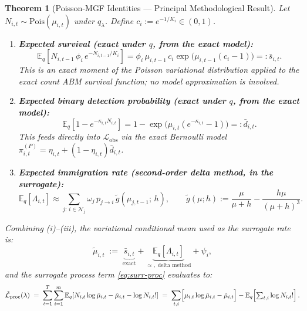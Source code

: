 \documentclass[review,12pt]{elsarticle}
\newtheorem{theorem}{Theorem}
\theoremstyle{definition}
\begin{document}
\begin{theorem}[Poisson-MGF Identities — Principal Methodological Result]\label{thm:elbo}
Let $N_{i,t}\sim\mathrm{Pois}(\mu_{i,t})$ under $q_\lambda$.
Define $c_i:=e^{-1/K_i}\in(0,1)$.
\begin{enumerate}[label=(\roman*)]
\item \textbf{Expected survival (exact under $q$, from the exact model):}
\begin{equation}\label{eq:surv-id}
\mathbb{E}_q\!\left[N_{i,t-1}\,\phi_i\,e^{-N_{i,t-1}/K_i}\right]
= \phi_i\,\mu_{i,t-1}\,c_i\exp\!\bigl(\mu_{i,t-1}(c_i-1)\bigr)
=: \bar{s}_{i,t}.
\end{equation}
This is an \emph{exact moment} of the Poisson variational distribution
applied to the exact count ABM survival function; no model approximation is involved.

\item \textbf{Expected binary detection probability (exact under $q$, from the exact model):}
\begin{equation}\label{eq:det-id}
\mathbb{E}_q\!\left[1-e^{-\kappa_{i,t}N_{i,t}}\right]
= 1-\exp\!\bigl(\mu_{i,t}(e^{-\kappa_{i,t}}-1)\bigr)
=: \bar{d}_{i,t}.
\end{equation}
This feeds directly into $\mathcal{L}_\mathrm{obs}$ via the exact Bernoulli
model $\pi^{(P)}_{i,t}=\eta_{i,t}+(1-\eta_{i,t})\bar{d}_{i,t}$.

\item \textbf{Expected immigration rate (second-order delta method, in the surrogate):}
\begin{equation}\label{eq:immig-id}
\mathbb{E}_q\!\left[\Lambda_{i,t}\right]
\approx
\sum_{j:\,i\in\mathcal{N}_j}\omega_j\,p_{j\to i}\,
\tilde{g}(\mu_{j,t-1};\,h),
\qquad
\tilde{g}(\mu;h):=\frac{\mu}{\mu+h}-\frac{h\mu}{(\mu+h)^3}.
\end{equation}
\end{enumerate}

Combining (i)--(iii), the variational conditional mean used as the surrogate
rate is:
\begin{equation}\label{eq:proc-mean}
\tilde\mu_{i,t}
\;:=\;
\underbrace{\bar{s}_{i,t}}_{\text{exact}}
+\underbrace{\mathbb{E}_q[\Lambda_{i,t}]}_{\approx,\;\text{delta method}}
+\psi_i,
\end{equation}
and the surrogate process term \eqref{eq:surr-proc} evaluates to:
\begin{equation}\label{eq:proc-elbo}
\tilde{\mathcal{L}}_\mathrm{proc}(\lambda)
\;=\;
\sum_{t=1}^T\sum_{i=1}^m
\mathbb{E}_q\!\left[N_{i,t}\log\tilde\mu_{i,t}-\tilde\mu_{i,t}-\log N_{i,t}!\right]
\;=\;
\sum_{t,i}
\Bigl[\mu_{i,t}\log\tilde\mu_{i,t}-\tilde\mu_{i,t}\Bigr]
-\mathbb{E}_q\!\left[\textstyle\sum_{t,i}\log N_{i,t}!\right].
\end{equation}
\end{theorem}
\end{document}
